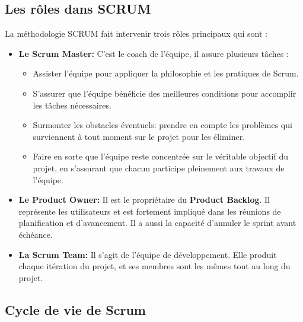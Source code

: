 \subsection{Les rôles dans SCRUM}
La méthodologie SCRUM fait intervenir trois rôles principaux qui sont :
\begin{itemize}
    \item \textbf{Le Scrum Master:} C’est le coach de l’équipe, il assure plusieurs tâches : 
    \begin{itemize}
    \item Assister l’équipe pour appliquer la philosophie et les pratiques de Scrum.
    \item S’assurer que l’équipe bénéficie des meilleures conditions pour accomplir les tâches nécessaires.
    \item Surmonter les obstacles éventuels: prendre en compte les problèmes qui surviennent à tout moment sur le projet pour les éliminer.
    \item Faire en sorte que l’équipe reste concentrée sur le véritable objectif du projet, en s’assurant que chacun participe pleinement aux travaux de l’équipe.
\end{itemize}
    \item \textbf{Le Product Owner:} Il est le propriétaire du \textbf{Product Backlog}. Il représente les utilisateurs et est fortement impliqué dans les réunions de planification et d’avancement. Il a aussi la capacité d’annuler le sprint avant échéance.
    \item \textbf{La Scrum Team:} Il s’agit de l’équipe de développement. Elle produit chaque itération du projet, et ses membres sont les mêmes tout au long du projet.
\end{itemize}
\subsection{Cycle de vie de Scrum}

